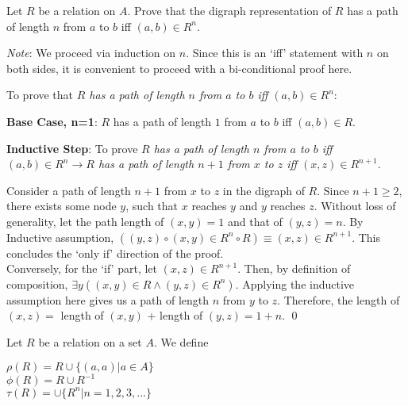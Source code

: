 \documentclass[addpoints]{exam}
\begin{document}
\begin{questions}
\begin{solution}
  \end{solution}
  
\question Let $R$ be a relation on $A$. Prove that the digraph representation of $R$ has a path of length $n$ from $a$ to $b$ iff $(a, b) \in R^n$.

  \begin{solution}
    \textit{Note}: We proceed via induction on $n$.  Since this is an `iff' statement with $n$ on both sides, it is convenient to proceed with a bi-conditional proof here.
    
    To prove that \textit{$R$ has a path of length $n$ from $a$ to $b$ iff $(a, b) \in R^n$}:
    
    \textbf{Base Case, n=1}: $R$ has a path of length $1$ from $a$ to $b$ iff $(a, b) \in R$.
    
    \textbf{Inductive Step}: To prove \textit{$R$ has a path of length $n$ from $a$ to $b$ iff $(a, b) \in R^n \rightarrow R$ has a path of length $n+1$ from $x$ to $z$ iff $(x, z) \in R^{n+1}$}.
    
    Consider a path of length $n+1$ from $x$ to $z$ in the digraph of $R$. Since $n+1 \geq 2$, there exists some node $y$, such that $x$ reaches $y$ and $y$ reaches $z$. Without loss of generality, let the path length of $(x,y) = 1$ and that of $(y,z) = n$. By Inductive assumption, $((y,z) \circ (x,y) \in R^n \circ R) \equiv (x,z) \in R^{n+1}$. This concludes the `only if' direction of the proof. \\
    Conversely, for the `if' part, let $(x,z) \in R^{n+1}$. Then, by definition of composition, $\exists y((x,y) \in R \wedge (y,z) \in R^n)$. Applying the inductive assumption here gives us a path of length $n$ from $y$ to $z$. Therefore, the length of $(x,z) =$ length of $(x,y)$ + length of $(y,z) = 1 + n$. \qed   
    \end{solution}

\question
    Let $R$ be a relation on a set $A$. We define

    $\rho (R) = R \cup \{(a, a) | a \in A\}$ \\ 
    $\phi (R) = R \cup R^{-1}$ \\
    $\tau (R) = \cup \{ R^n | n = 1,2,3,...\}$
    

\end{questions}
\end{document}
